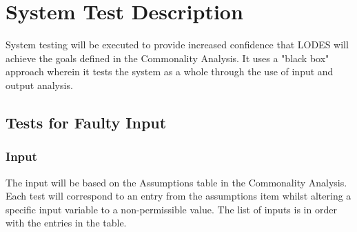 \documentclass[12pt, titlepage]{article}
\newcommand{\famname}{LODES} %
\begin{document}


\section{System Test Description}
System testing will be executed to provide increased confidence that \famname{} will achieve the goals defined in 
the Commonality Analysis. It uses a "black box"   approach wherein it tests the system as a whole through the use 
of input and output analysis.

\subsection{Tests for Faulty Input}

\subsubsection{Input}
		
The input will be based on the Assumptions table in the Commonality Analysis. Each test will correspond to an 
entry from the assumptions item whilst altering a specific input variable to a non-permissible value. The list of 
inputs is in order with the entries in the table.
\end{document}
